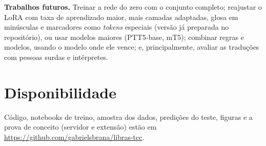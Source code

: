 \documentclass[12pt]{article}
\begin{document}
\textbf{Trabalhos futuros.} Treinar a rede do zero com o conjunto completo; reajustar o LoRA com taxa de aprendizado maior, mais camadas adaptadas, glosa em minúsculas e marcadores como \emph{tokens} especiais (versão já preparada no repositório), ou usar modelos maiores (PTT5-base, mT5); combinar regras e modelos, usando o modelo onde ele vence; e, principalmente, avaliar as traduções com pessoas surdas e intérpretes.

\section*{Disponibilidade}
Código, notebooks de treino, amostra dos dados, predições do teste, figuras e a prova de conceito (servidor e extensão) estão em \url{https://github.com/gabrielsbrana/libras-tcc}.
\end{document}
